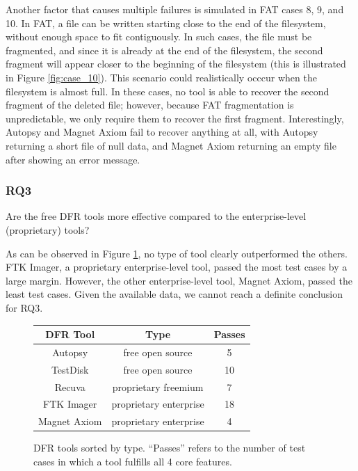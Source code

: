 Another factor that causes multiple failures is simulated in FAT cases 8, 9, and 10.
In FAT, a file can be written starting close to the end of the filesystem, without enough space to fit contiguously.
In such cases, the file must be fragmented, and since it is already at the end of the filesystem, the second fragment will appear closer to the beginning of the filesystem (this is illustrated in Figure \ref{fig:case_10}).
This scenario could realistically occcur when the filesystem is almost full.
In these cases, no tool is able to recover the second fragment of the deleted file; however, because FAT fragmentation is unpredictable, we only require them to recover the first fragment.
Interestingly, Autopsy and Magnet Axiom fail to recover anything at all, with Autopsy returning a short file of null data, and Magnet Axiom returning an empty file after showing an error message.

\subsubsection{RQ3}
Are the free DFR tools more effective compared to the enterprise-level (proprietary) tools?

As can be observed in Figure \ref{fig:results_table}, no type of tool clearly outperformed the others.
FTK Imager, a proprietary enterprise-level tool, passed the most test cases by a large margin.
However, the other enterprise-level tool, Magnet Axiom, passed the least test cases.
Given the available data, we cannot reach a definite conclusion for RQ3.

\begin{figure}[h]
    \begin{tabular}{| c | c | c |}
    \hline
    \textbf{DFR Tool} &  \textbf{Type} &  \textbf{Passes} \\ \hline
    Autopsy & free open source & 5 \\ \hline
    TestDisk & free open source & 10 \\ \hline
    Recuva & proprietary freemium & 7 \\ \hline
    FTK Imager & proprietary enterprise & 18 \\ \hline
    Magnet Axiom & proprietary enterprise & 4 \\ \hline
    \end{tabular}
    
    \caption{DFR tools sorted by type. ``Passes'' refers to the number of test cases in which a tool fulfills all 4 core features.}
    \label{fig:results_table}
\end{figure}

